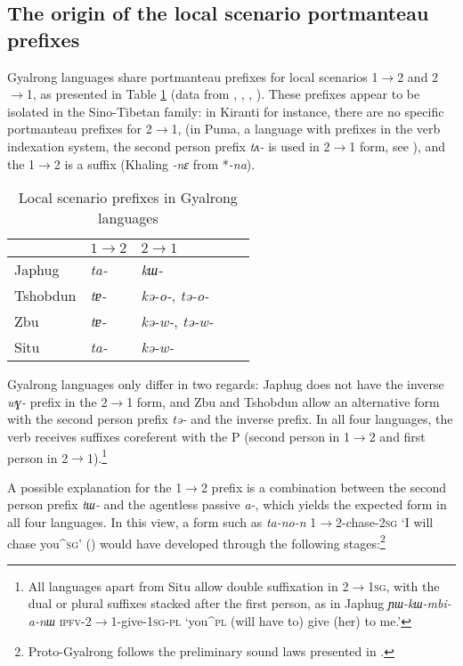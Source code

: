 \documentclass[oneside,a4paper,11pt]{article}
\newcommand{\ipa}[1]{\textit{\phon\mbox{#1}}} %
\begin{document}
\subsection{The origin of the local scenario portmanteau prefixes}

Gyalrong languages share portmanteau prefixes for local scenarios 1$\rightarrow$2 and 2$\rightarrow$1, as presented in Table \ref{tab:local.rgy} (data from \citealt[218]{linxr93jiarong}, \citealt{jackson02rentongdengdi}, \citealt{jacques12agreement}, \citealt{gongxun14agreement}). These prefixes appear to be isolated in the Sino-Tibetan family: in Kiranti for instance, there are no specific portmanteau prefixes for 2$\rightarrow$1, (in Puma, a language with prefixes in the verb indexation system, the second person prefix \ipa{tʌ-} is used in 2$\rightarrow$1 form, see \citealt{bickel07puma}), and the 1$\rightarrow$2 is a suffix (Khaling \ipa{-nɛ} from *\ipa{-na}).

\begin{table}
\caption{Local scenario prefixes in Gyalrong languages} \centering \label{tab:local.rgy} 
\begin{tabular}{lllll}
\toprule
& $1\rightarrow2$ & $2\rightarrow1$ \\
\midrule
Japhug &  \ipa{ta-} & \ipa{kɯ-} \\
Tshobdun &  \ipa{tɐ-} & \ipa{kə-o-}, \ipa{tə-o-} \\
Zbu &  \ipa{tɐ-} &\ipa{kə-w-}, \ipa{tə-w-} \\
Situ &  \ipa{ta-} & \ipa{kə-w-} \\
\bottomrule
\end{tabular}
\end{table}

Gyalrong languages only differ in two regards: Japhug does not have the inverse \ipa{wɣ-} prefix in the  2$\rightarrow$1 form, and Zbu and Tshobdun allow an alternative form with the second person prefix \ipa{tə-} and the inverse prefix. In all four languages, the verb receives suffixes coreferent with the P (second person in 1$\rightarrow$2 and first person in  2$\rightarrow$1).\footnote{All languages apart from Situ allow double suffixation in 2$\rightarrow$\textsc{1sg}, with the dual or plural suffixes stacked after the first person, as in Japhug \ipa{ɲɯ-kɯ-mbi-a-nɯ} \textsc{ipfv}-2$\rightarrow$1-give-\textsc{1sg-pl} `you^{\textsc{pl}} (will have to) give (her) to me.'}

A possible explanation for the 1$\rightarrow$2  prefix is a combination between the second person prefix \ipa{tɯ-} and the agentless passive \ipa{a-}, which yields the expected form in all four languages. In this view, a form such as \ipa{ta-no-n} 1$\rightarrow$2-chase-\textsc{2sg} `I will chase you^{\textsc{sg}}' (\citealt[219]{linxr93jiarong}) would have developed through the following stages:\footnote{Proto-Gyalrong follows the preliminary sound laws presented in \citet{jacques04these}.}
\end{document}
